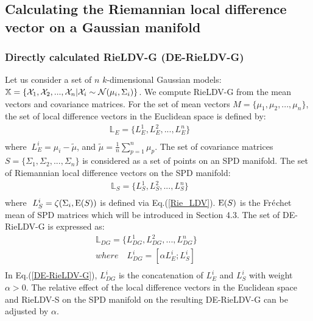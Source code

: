 \documentclass[review]{elsarticle}
\begin{document}
\subsection{Calculating the Riemannian local difference vector on a Gaussian manifold} 
\vspace{8 pt}
\subsubsection{Directly calculated RieLDV-G (DE-RieLDV-G)}
	Let us consider a set of $n$ $k$-dimensional Gaussian models: $\mathbb{X} =  \{\mathcal{X}_1,\mathcal{X}_2,...,\\ \mathcal{X}_n|\mathcal{X}_i \sim \mathcal{N}(\mu_i,\Sigma_i)\}$. We compute RieLDV-G from the  mean vectors and covariance matrices. For the set of mean vectors $M = \{ \mu_1,\mu_2,...,\mu_n \}$, the set of local difference vectors in the Euclidean space is defined  by:
\begin{equation}
\label{LDV}
\begin{split}
\mathbb{L}_{E} = \{L_E^1,L_E^2,...,L_E^n \}  \qquad  \\
\end{split}
\end{equation} 
where $\ L_E^i = \mu_i - \tilde{\mu}$, and $\tilde{\mu} = \frac{1}{n}\sum_{p=1}^{n}\mu_p$. The set of covariance matrices $S = \{ \Sigma_1,\Sigma_2,...,\Sigma_n \}$ is considered as  a set of points on an SPD manifold. The set of Riemannian local difference vectors on the SPD manifold:
\begin{equation}
\label{RieLDV-S_k}
\begin{split}
\mathbb{L}_S = \{L_S^1,L_S^2,...,L_S^n \}  \qquad \\
\end{split}
\end{equation} 
where $\ L_S^i = \zeta(\Sigma_i,{\rm E}(S))$ is defined via {Eq.(\ref{Rie_LDV})}. ${\rm E}(S)$ is the Fr$\acute{\rm e}$chet mean of SPD matrices which will be introduced in Section 4.3. The set of DE-RieLDV-G is expressed as: 
\begin{equation}
\label{DE-RieLDV-G}
\begin{split}
\mathbb{L}_{DG} = \{L_{DG}^1,L_{DG}^2,...,L_{DG}^n \}  \qquad  \\
where \quad L_{DG}^i = [\alpha L_E^i;L_S^i] \quad \qquad   \\
\end{split}
\end{equation}
In {Eq.(\ref{DE-RieLDV-G})}, $L_{DG}^i$ is the concatenation of $L_E^i$ and $L_S^i$ with weight $\alpha > 0$. The relative effect of the local difference vectors in the Euclidean space and RieLDV-S on the SPD manifold on the resulting DE-RieLDV-G can be adjusted by $\alpha$. 
\end{document}
